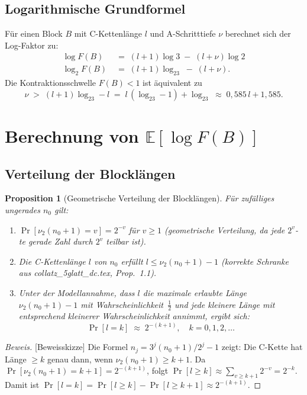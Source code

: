 \documentclass[12pt,a4paper]{article}
\newtheorem{proposition}[definition]{Proposition}
\newenvironment{beweis}{\begin{proof}[Beweis]}{\end{proof}}
\newcommand{\vii}{\nu_2}
\newcommand{\E}{\mathbb{E}}
\newcommand{\logt}{\log_2}        %
\begin{document}
\subsection{Logarithmische Grundformel}

Für einen Block $B$ mit C-Kettenlänge $l$ und A-Schritttiefe $\nu$
berechnet sich der Log-Faktor zu:
\begin{align}
  \log F(B) &\;=\; (l+1)\log 3 \;-\; (l+\nu)\log 2 \label{eq:logF}\\
  \logt F(B) &\;=\; (l+1)\logt 3 \;-\; (l+\nu). \label{eq:logF2}
\end{align}
Die Kontraktionsschwelle $F(B) < 1$ ist äquivalent zu
\[
  \nu \;>\; (l+1)\logt 3 - l \;=\; l\,(\logt 3 - 1) + \logt 3
  \;\approx\; 0{,}585\,l + 1{,}585.
\]

\section{Berechnung von \texorpdfstring{$\E[\log F(B)]$}{E[log F(B)]}}
\label{sec:erwartungswert}

\subsection{Verteilung der Blocklängen}

\begin{proposition}[Geometrische Verteilung der Blocklängen]
\label{prop:geom-verteilung}
Für zufälliges ungerades $n_0$ gilt:
\begin{enumerate}[label=(\roman*)]
  \item $\Pr[\vii(n_0+1) = v] = 2^{-v}$ für $v \geq 1$
    (geometrische Verteilung, da jede $2^v$-te gerade Zahl durch $2^v$ teilbar ist).
  \item Die C-Kettenlänge $l$ von $n_0$ erfüllt $l \leq \vii(n_0+1) - 1$
    (korrekte Schranke aus \textit{collatz\_5glatt\_dc.tex}, Prop.~1.1).
  \item Unter der Modellannahme, dass $l$ die maximale erlaubte Länge
    $\vii(n_0+1) - 1$ mit Wahrscheinlichkeit~$\frac{1}{2}$ und jede kleinere
    Länge mit entsprechend kleinerer Wahrscheinlichkeit annimmt, ergibt sich:
    \[
      \Pr[l = k] \;\approx\; 2^{-(k+1)}, \quad k = 0, 1, 2, \ldots
    \]
\end{enumerate}
\end{proposition}

\begin{beweis}[Beweisskizze]
Die Formel $n_j = 3^j(n_0+1)/2^j - 1$ zeigt: Die C-Kette hat Länge
$\geq k$ genau dann, wenn $\vii(n_0+1) \geq k+1$. Da $\Pr[\vii(n_0+1) = k+1] = 2^{-(k+1)}$,
folgt $\Pr[l \geq k] \approx \sum_{v \geq k+1} 2^{-v} = 2^{-k}$.
Damit ist $\Pr[l = k] = \Pr[l \geq k] - \Pr[l \geq k+1] \approx 2^{-(k+1)}$.
\end{beweis}
\end{document}
